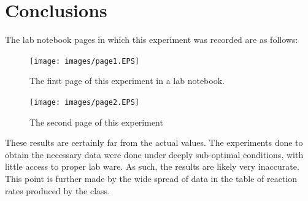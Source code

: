 \documentclass[12pt]{article}
\begin{document}
	\section{Conclusions}
	The lab notebook pages in which this experiment was recorded are as follows:
	\begin{figure}[H]
	  \centering
	  \begin{minipage}[b]{0.4\textwidth}
	    \texttt{[image: images/page1.EPS]}
	    \caption{The first page of this experiment in a lab notebook.}
	  \end{minipage}
	  \hfill
	  \begin{minipage}[b]{0.4\textwidth}
	    \texttt{[image: images/page2.EPS]}
	    \caption{The second page of this experiment}
	  \end{minipage}
	\end{figure}
	These results are certainly far from the actual values. The experiments done to obtain the necessary data were done under deeply sub-optimal conditions, with little access to proper lab ware. As such, the results are likely very inaccurate. This point is further made by the wide spread of data in the table of reaction rates produced by the class. 
	
\end{document}
